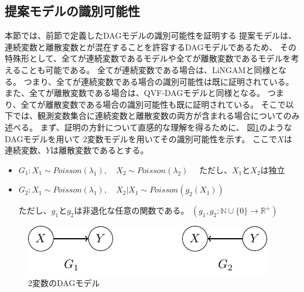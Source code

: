 
\subsection{提案モデルの識別可能性}

本節では、前節で定義したDAGモデルの識別可能性を証明する
提案モデルは、連続変数と離散変数とが混在することを許容するDAGモデルであるため、
その特殊形として、全てが連続変数であるモデルや全てが離散変数であるモデルを考えることも可能である。
全てが連続変数である場合は、LiNGAM\cite{Shimizu2006-yu}と同様となる。
つまり、全てが連続変数である場合の識別可能性は既に証明されている\cite{Shimizu2006-yu}。
また、全てが離散変数である場合は、QVF-DAGモデル\cite{Park2017-hw}と同様となる。
つまり、全てが離散変数である場合の識別可能性も既に証明されている\cite{Park2017-hw}。
そこで以下では、観測変数集合に連続変数と離散変数の両方が含まれる場合についてのみ述べる。
まず、証明の方針について直感的な理解を得るために、
図\ref{fig:ex_prop_bivariate}のようなDAGモデルを用いて
2変数モデルを用いてその識別可能性を示す。
ここで$X$は連続変数、$Y$は離散変数であるとする。

\begin{itemize}
  \item $G_1 \colon X_1 \sim \mathit{Poisson}(\lambda_1),
         \quad X_2 \sim \mathit{Poisson}(\lambda_2) \quad$ ただし、$X_1$と$X_2$は独立

  \item $G_2 \colon X_1 \sim \mathit{Poisson}(\lambda_1),
         \quad X_2|X_1 \sim \mathit{Poisson}(g_2(X_1))$

  ただし、$g_1$と$g_2$は非退化な任意の関数である。
  $(g_1, g_2 \colon \mathbb{N} \cup \{ 0 \} \rightarrow \mathbb{R}^+)$
\end{itemize}

\begin{figure}[h]
  \centering
  \includegraphics{./picture/prop_bivariate.pdf}
  \caption{2変数のDAGモデル}
  \label{fig:ex_prop_bivariate}
\end{figure}
